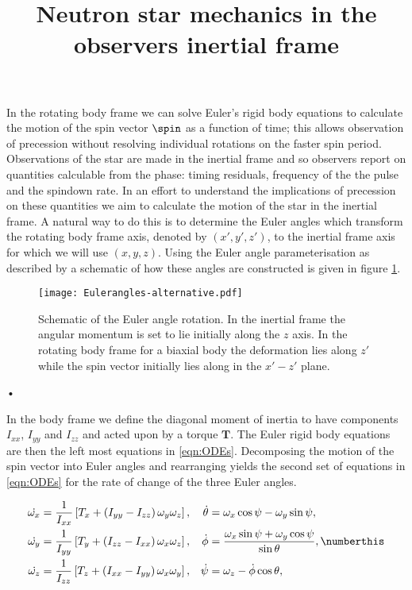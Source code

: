 \documentclass[/home/greg/Thesis/main/main.tex]{subfiles}
\title{Neutron star mechanics in the observers inertial frame}
\author{}
\begin{document}
\graphicspath{{/home/greg/Neutron_star_modelling/TimingNoiseModels/InertialSpaceResults/img/}}


\maketitle

In the rotating body frame we can solve Euler's rigid body equations to
calculate the motion of the spin vector $\spin$ as a function of time; this
allows observation of precession without resolving individual rotations on the
faster spin period. Observations of the star are made in the inertial frame and
so observers report on quantities calculable from the phase: timing residuals,
frequency of the the pulse and the spindown rate. In an effort to understand
the implications of precession on these quantities we aim to calculate the
motion of the star in the inertial frame.  A natural way to do this  is to
determine the Euler angles which transform the rotating body frame axis,
denoted by $(x',y', z')$, to the inertial frame axis for which we will use $(x,
y, z)$. Using the Euler angle parameterisation as described by
\citet{Landau1969} a schematic of how these angles are constructed is given in
figure \ref{fig:Euler}. 

\begin{figure}[ht]
\centering
\texttt{[image: Eulerangles-alternative.pdf]}
\caption{Schematic of the Euler angle rotation. In the inertial frame the
angular momentum is set to lie initially along the $z$ axis. In the rotating
body frame for a biaxial body the deformation lies along $z'$ while the spin
vector initially lies along in the $x'- z'$ plane.}
\label{fig:Euler}
\end{figure}•

In the body frame we define the diagonal moment of inertia to have components
$I_{xx}$, $I_{yy}$ and $I_{zz}$ and acted upon by a torque $\boldsymbol{T}$. The
Euler rigid body equations are then the left most equations in
\eqref{eqn:ODEs}.
Decomposing the motion of the spin vector into Euler angles and rearranging
yields the second set of equations in \eqref{eqn:ODEs} for the rate of change
of the three Euler angles.

\begin{align*}
\dot{\omega_{x}} & = \frac{1}{I_{xx}}\left[T_{x}  + \left(I_{yy} - I_{zz}\right) \omega_{y} \omega_{z}\right],   &  
       \dot{\theta} & = \omega_{x} \cos \psi - \omega_{y} \sin \psi,
 \\
\dot{\omega_{y}} & =  \frac{1}{I_{yy}}\left[T_{y}  + \left(I_{zz} - I_{xx}\right) \omega_{x} \omega_{z}\right], & 
     \dot{\phi}  & = \frac{\omega_{x} \sin \psi + \omega_{y} \cos \psi}{\sin \theta}, 
\numberthis \label{eqn:ODEs}
\\
\dot{\omega_{z}} & =\frac{1}{I_{zz}}\left[T_{z}  + \left(I_{xx} - I_{yy}\right) \omega_{x} \omega_{y}\right],  & 
     \dot{\psi} & =  \omega_{z} - \dot{\phi} \cos \theta ,
\end{align*}
\end{document}

